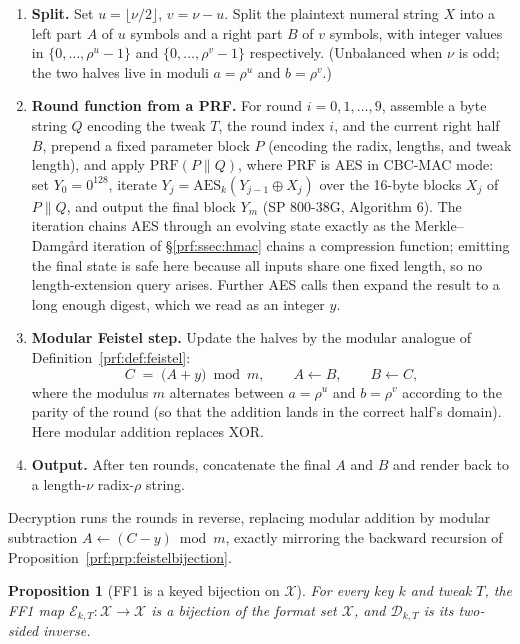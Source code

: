 \documentclass[11pt,a4paper]{article}
\newtheorem{proposition}[theorem]{Proposition}
\theoremstyle{definition}
\theoremstyle{remark}
\begin{document}
\begin{enumerate}
\item \textbf{Split.} Set \(u = \lfloor \nu/2 \rfloor\), \(v = \nu - u\). Split the plaintext numeral string \(X\) into a left part \(A\) of \(u\) symbols and a right part \(B\) of \(v\) symbols, with integer values in \(\{0,\dots,\rho^{u}-1\}\) and \(\{0,\dots,\rho^{v}-1\}\) respectively. (Unbalanced when \(\nu\) is odd; the two halves live in moduli \(a = \rho^{u}\) and \(b = \rho^{v}\).)
\item \textbf{Round function from a PRF.} For round \(i = 0, 1, \dots, 9\), assemble a byte string \(Q\) encoding the tweak \(T\), the round index \(i\), and the current right half \(B\), prepend a fixed parameter block \(P\) (encoding the radix, lengths, and tweak length), and apply \(\mathrm{PRF}(P \parallel Q)\), where \(\mathrm{PRF}\) is AES in CBC-MAC mode: set \(Y_0 = 0^{128}\), iterate \(Y_j = \mathrm{AES}_k(Y_{j-1} \oplus X_j)\) over the 16-byte blocks \(X_j\) of \(P \parallel Q\), and output the final block \(Y_m\) (SP 800-38G, Algorithm 6). The iteration chains AES through an evolving state exactly as the Merkle--Damg\aa rd iteration of \S\ref{prf:ssec:hmac} chains a compression function; emitting the final state is safe here because all inputs share one fixed length, so no length-extension query arises. Further AES calls then expand the result to a long enough digest, which we read as an integer \(y\).
\item \textbf{Modular Feistel step.} Update the halves by the modular analogue of Definition~\ref{prf:def:feistel}:
\[
  C \;=\; \bigl(A + y\bigr) \bmod m, \qquad A \leftarrow B, \qquad B \leftarrow C,
\]
where the modulus \(m\) alternates between \(a = \rho^{u}\) and \(b = \rho^{v}\) according to the parity of the round (so that the addition lands in the correct half's domain). Here modular addition replaces XOR.
\item \textbf{Output.} After ten rounds, concatenate the final \(A\) and \(B\) and render back to a length-\(\nu\) radix-\(\rho\) string.
\end{enumerate}

Decryption runs the rounds in reverse, replacing modular addition by modular subtraction \(A \leftarrow (C - y) \bmod m\), exactly mirroring the backward recursion of Proposition~\ref{prf:prp:feistelbijection}.

\begin{proposition}[FF1 is a keyed bijection on \(\mathcal{X}\)]\label{prf:prp:ff1bijection}
For every key \(k\) and tweak \(T\), the FF1 map \(\mathcal{E}_{k,T} \colon \mathcal{X} \to \mathcal{X}\) is a bijection of the format set \(\mathcal{X}\), and \(\mathcal{D}_{k,T}\) is its two-sided inverse.
\end{proposition}
\end{document}
